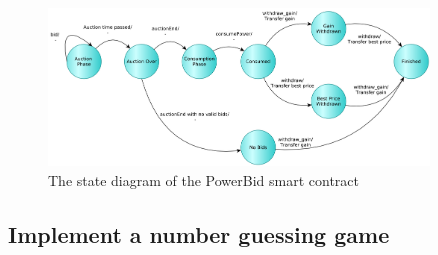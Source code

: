 \documentclass[a4paper]{article}
\begin{document}
\begin{figure}[H]
    \centering
    \includegraphics[width=0.9\textwidth]{figures/state_diagram.png}
    \caption{The state diagram of the PowerBid smart contract}
    \label{fig:State-diagram-powerbid}
\end{figure}


\subsection{Implement a number guessing game}
\end{document}
